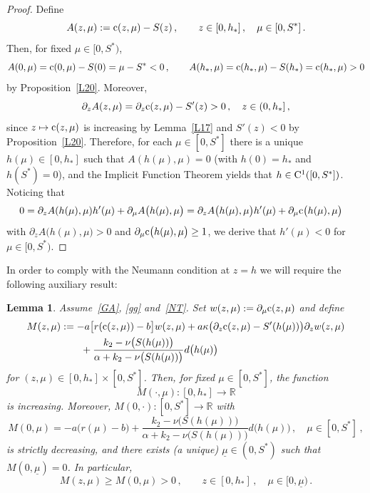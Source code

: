 \documentclass[reqno,11pt]{amsart}
\newtheorem{lem}[thm]{Lemma}
\numberwithin{equation}{section}
\newcommand{\R}{\mathbb{R}}
\begin{document}
\begin{proof}
Define
$$
A(z,\mu):={\rm c}(z,\mu)-S(z)\,,\qquad z\in [0,h_*]\,,\quad \mu\in [0,S^*]\,.
$$
Then, for fixed $\mu\in [0,S^*)$,
$$
A(0,\mu)={\rm c}(0,\mu)-S(0)=\mu-S^*<0\,,\qquad A(h_*,\mu)={\rm c}(h_*,\mu)-S(h_*)={\rm c}(h_*,\mu)>0
$$
by Proposition~\ref{L20}. Moreover, 
$$
\partial_z A(z,\mu)=\partial_z{\rm c}(z,\mu)-S'(z)>0\,,\quad z\in (0,h_*]\,,
$$
since \(z\mapsto {\rm c}(z,\mu)\) is increasing by Lemma~\ref{L17} and \(S'(z)<0\) by Proposition~\ref{L20}. Therefore, for each $\mu\in [0,S^*]$ there is a unique $h(\mu)\in [0,h_*]$ such that $A(h(\mu),\mu)=0$ (with $h(0)=h_*$ and $h(S^*)=0$), and the Implicit Function Theorem yields that $h\in {\rm C}^1([0,S^*])$. Noticing that
\begin{align*}
0&=\partial_zA(h(\mu),\mu) h'(\mu)+\partial_\mu A\big(h(\mu),\mu\big)=\partial_zA\big(h(\mu),\mu\big) h'(\mu)+\partial_\mu {\rm c}\big(h(\mu),\mu\big)
\end{align*}
with $\partial_zA\big(h(\mu),\mu\big)>0$ and $\partial_\mu {\rm c}\big(h(\mu),\mu\big)\ge 1$, we derive that $h'(\mu)<0$ for $\mu\in [0,S^*)$.
\end{proof}

In order to comply with the Neumann condition at $z=h$ we will require the following auxiliary result:

\begin{lem}\label{L22}
Assume~\eqref{GA}, \eqref{gg} and~\eqref{NT}. Set $w(z,\mu):=\partial_\mu{\rm c}(z,\mu)$ and define
\begin{align*}
M(z,\mu)&:=-a\big[r({\rm c}(z,\mu))-b\big]w(z,\mu)+a\kappa\big(\partial_z{\rm c}(z,\mu)-S'(h(\mu))\big) \partial_z w(z,\mu)\\
&\qquad +\frac{k_2-\nu\big(S(h(\mu))\big)}{\alpha+k_2-\nu\big(S(h(\mu))\big)}d\big(h(\mu)\big)
\end{align*}
for $(z,\mu)\in [0,h_*]\times [0,S^*]$. Then, for fixed $\mu\in [0,S^*]$, the function
$$
M(\cdot,\mu):[0,h_*]\to \R
$$ 
is increasing. Moreover,
$M(0,\cdot):[0,S^*]\to\R$ with
$$
M(0,\mu)=-a\big(r(\mu)-b\big)+\frac{k_2-\nu\big(S(h(\mu))\big)}{\alpha+k_2-\nu\big(S(h(\mu))\big)}d\big(h(\mu)\big)\,,\quad \mu\in [0,S^*]\,,
$$
is strictly decreasing, and there exists (a unique) $\underline{\mu}\in (0,S^*)$ such that $M(0,\underline{\mu})=0$. In particular,
\begin{equation}\label{M}
M(z,\mu)\ge M(0,\mu)>0\,,\qquad z\in [0,h_*]\,,\quad \mu\in [0,\underline{\mu})\,.
\end{equation}
\end{lem}
\end{document}
